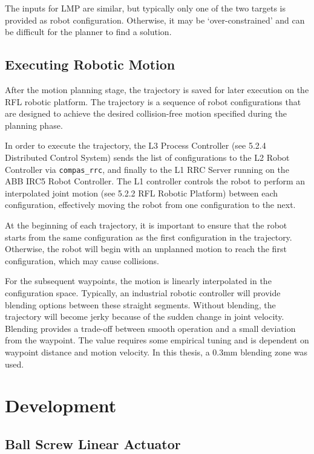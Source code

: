 The inputs for LMP are similar, but typically only one of the two targets is provided as robot configuration. Otherwise, it may be ‘over-constrained’ and can be difficult for the planner to find a solution.


\subsection{Executing Robotic Motion}
\label{subsection:exploration_2_executing_robotic_motion}

After the motion planning stage, the trajectory is saved for later execution on the RFL robotic platform. The trajectory is a sequence of robot configurations that are designed to achieve the desired collision-free motion specified during the planning phase.

In order to execute the trajectory, the L3 Process Controller (see 5.2.4 Distributed Control System) sends the list of configurations to the L2 Robot Controller via \verb|compas_rrc|, and finally to the L1 RRC Server running on the ABB IRC5 Robot Controller. The L1 controller controls the robot to perform an interpolated joint motion (see 5.2.2 RFL Robotic Platform) between each configuration, effectively moving the robot from one configuration to the next.

At the beginning of each trajectory, it is important to ensure that the robot starts from the same configuration as the first configuration in the trajectory. Otherwise, the robot will begin with an unplanned motion to reach the first configuration, which may cause collisions.

For the subsequent waypoints, the motion is linearly interpolated in the configuration space. Typically, an industrial robotic controller will provide blending options between these straight segments. Without blending, the trajectory will become 	jerky because of the sudden change in joint velocity. Blending provides a trade-off between smooth operation and a small deviation from the waypoint. The value requires some empirical tuning and is dependent on waypoint distance and motion velocity. In this thesis, a 0.3mm blending zone was used. 

\section{Development}
\label{section:exploration_2_development}

\subsection{Ball Screw Linear Actuator}
\label{subsection:exploration_2_ball_screw_linear_actuator}

